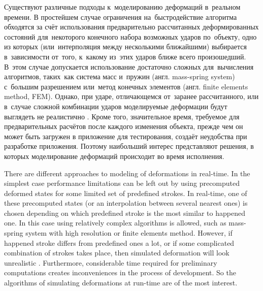 \documentclass[a4paper, 12pt, titlepage]{extarticle}
\newcommand{\eng}[1]{#1}
\begin{document}
\begin{original}
    Существуют различные подходы к~моделированию деформаций в~реальном времени. В простейшем случае
    ограничения на~быстродействие алгоритма обходятся за счёт использования предварительно рассчитанных
    деформированных состояний для~некоторого конечного набора возможных ударов по~объекту, одно из которых
    (или~интерполяция между несколькими ближайшими) выбирается в~зависимости от~того, к~какому
    из~этих ударов ближе всего произошедший. В~этом случае допускается использование достаточно сложных
    для~вычисления алгоритмов, таких~как система масс и~пружин (англ. \eng{mass-spring system})
    с~большим разрешением или~метод конечных элементов (англ. \eng{finite elements method, FEM}).
    Однако, при ударе, отличающемся от~заранее рассчитанного, или в~случае сложной комбинации ударов
    моделируемые деформации будут выглядеть не реалистично \cite[раздел~2]{chang-crash}. Кроме того, значительное время, требуемое
    для предварительных расчётов после каждого изменения объекта, прежде чем он может быть загружен
    в приложение для тестирования, создаёт неудобства при разработке приложения. Поэтому наибольший
    интерес представляют решения, в которых моделирование деформаций происходит во время исполнения.
\end{original}

    There are different approaches to modeling of deformations in real-time. In the simplest case
    performance limitations can be left out by using precomputed deformed states for some limited
    set of predefined strokes. In real-time, one of these precomputed states (or an interpolation
    between several nearest ones) is chosen depending on which predefined stroke is the most similar
    to happened one. In this case using relatively complex algorithms is allowed, such as
    mass-spring system with high resolution or finite elements method. However, if happened stroke
    differs from predefined ones a lot, or if some complicated combination of strokes takes place,
    then simulated deformation will look unrealistic \cite[section~2]{chang-crash}. Furthermore,
    considerable time required for preliminary computations creates inconveniences in the process of
    development. So the algorithms of simulating deformations at run-time are of the most interest.
\end{document}
